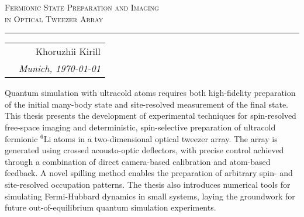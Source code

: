 
\begin{center}
    \LARGE \textsc{Fermionic State Preparation and Imaging \\ in Optical Tweezer Array}
\end{center}

\hrule

\phantom{42}

\begin{flushright}
    \begin{tabular}{rr}
        & Khoruzhii Kirill \\
        & \textit{Munich, \today}\\
    \end{tabular}
\end{flushright}

\noindent
Quantum simulation with ultracold atoms requires both high-fidelity preparation of the initial many-body state and site-resolved measurement of the final state. This thesis presents the development of experimental techniques for spin-resolved free-space imaging and deterministic, spin-selective preparation of ultracold fermionic $^6$Li atoms in a two-dimensional optical tweezer array. The array is generated using crossed acousto-optic deflectors, with precise control achieved through a combination of direct camera-based calibration and atom-based feedback. A novel spilling method enables the preparation of arbitrary spin- and site-resolved occupation patterns. The thesis also introduces numerical tools for simulating Fermi-Hubbard dynamics in small systems, laying the groundwork for future out-of-equilibrium quantum simulation experiments.







\thispagestyle{empty}

\tableofcontents


